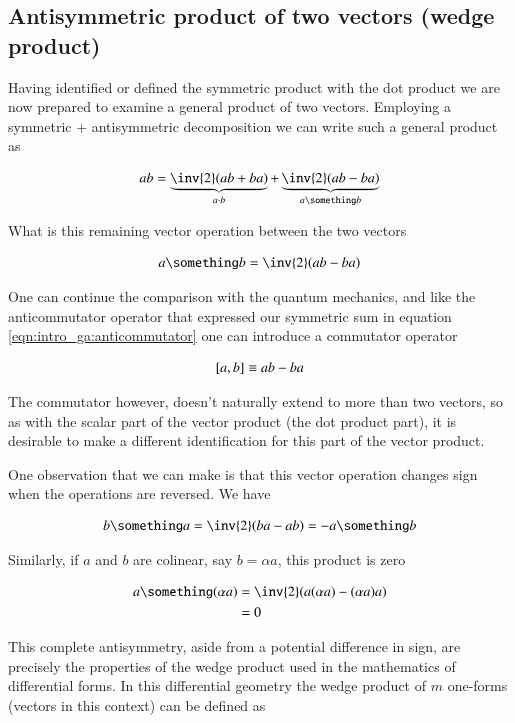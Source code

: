 \subsection{Antisymmetric product of two vectors (wedge product) }

Having identified or defined the symmetric product with the dot product we are now prepared to examine a general product of two vectors.  Employing a symmetric + antisymmetric decomposition we can write such a general product as

\begin{align*}
a b = \underbrace{\inv{2}(a b + b a)}_{a \cdot b} + \underbrace{ \inv{2} ( a b - b a ) }_{ a \something b }
\end{align*}

What is this remaining vector operation between the two vectors

\begin{align*}
a \something b = \inv{2} ( a b - b a )
\end{align*}

One can continue the comparison with the quantum mechanics, and like the
anticommutator operator that expressed our symmetric sum in equation
\ref{eqn:intro_ga:anticommutator} one can introduce a commutator operator

\begin{align}\label{eqn:intro_ga:commutator}
\left[{a},{b}\right] \equiv a b - b a
\end{align}

The commutator however, doesn't naturally extend to more than two vectors, so
as with the scalar part of the vector product (the dot product part), 
it is desirable to make a different identification for this part of the vector
product.

One observation that we can make is that this vector operation changes sign when the operations are reversed.  We have

\begin{align*}
b \something a = \inv{2} ( b a - a b) = - a \something b
\end{align*}

Similarly, if $a$ and $b$ are colinear, say $b = \alpha a$, this product is zero

\begin{align*}
a \something (\alpha a)
&= \inv{2} ( a  (\alpha a) - (\alpha a) a ) \\
&= 0
\end{align*}

This complete antisymmetry, aside from a potential difference in sign, are precisely the properties of the wedge product used in the mathematics of differential forms.  In this differential geometry the wedge product of $m$ one-forms (vectors in this context) can be defined as

